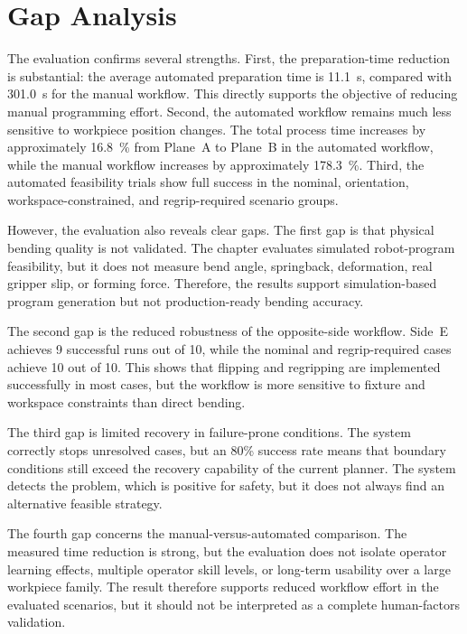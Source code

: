 \section{Gap Analysis}
\label{sec:gap-analysis}

The evaluation confirms several strengths. First, the preparation-time reduction is substantial: the average automated preparation time is \SI{11.1}{\second}, compared with \SI{301.0}{\second} for the manual workflow. This directly supports the objective of reducing manual programming effort. Second, the automated workflow remains much less sensitive to workpiece position changes. The total process time increases by approximately \SI{16.8}{\percent} from Plane~A to Plane~B in the automated workflow, while the manual workflow increases by approximately \SI{178.3}{\percent}. Third, the automated feasibility trials show full success in the nominal, orientation, workspace-constrained, and regrip-required scenario groups.

However, the evaluation also reveals clear gaps. The first gap is that physical bending quality is not validated. The chapter evaluates simulated robot-program feasibility, but it does not measure bend angle, springback, deformation, real gripper slip, or forming force. Therefore, the results support simulation-based program generation but not production-ready bending accuracy.

The second gap is the reduced robustness of the opposite-side workflow. Side~E achieves 9 successful runs out of 10, while the nominal and regrip-required cases achieve 10 out of 10. This shows that flipping and regripping are implemented successfully in most cases, but the workflow is more sensitive to fixture and workspace constraints than direct bending.

The third gap is limited recovery in failure-prone conditions. The system correctly stops unresolved cases, but an 80\% success rate means that boundary conditions still exceed the recovery capability of the current planner. The system detects the problem, which is positive for safety, but it does not always find an alternative feasible strategy.

The fourth gap concerns the manual-versus-automated comparison. The measured time reduction is strong, but the evaluation does not isolate operator learning effects, multiple operator skill levels, or long-term usability over a large workpiece family. The result therefore supports reduced workflow effort in the evaluated scenarios, but it should not be interpreted as a complete human-factors validation.

